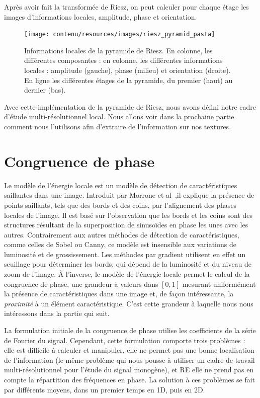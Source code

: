 Après avoir fait la transformée de Riesz, on peut calculer pour chaque étage les images d'informations locales, amplitude, phase et orientation.

\begin{figure}[hp]
    \centering
    \texttt{[image: contenu/resources/images/riesz\_pyramid\_pasta]}
    \caption[Informations locales de la pyramide de Riesz]{Informations locales de la pyramide de Riesz. En colonne, les différentes composantes : en colonne, les différentes informations locales : amplitude (gauche), phase (milieu) et orientation (droite). En ligne les différentes étages de la pyramide, du premier (haut) au dernier (bas).}
    \label{fig:riesz-pyramid-local}
\end{figure}

Avec cette implémentation de la pyramide de Riesz, nous avons défini notre cadre d'étude multi-résolutionnel local. Nous allons voir dans la prochaine partie comment nous l'utilisons afin d'extraire de l'information sur nos textures.

\section{Congruence de phase}

Le modèle de l'énergie locale est un modèle de détection de caractéristiques saillantes dans une image. Introduit par Morrone et al~\cite{morrone_mach_1986, morrone_feature_1987},il explique la présence de points saillants, tels que des bords et des coins, par l'alignement des phases locales de l'image. Il est basé sur l'observation que les bords et les coins sont des structures résultant de la superposition de sinusoïdes en phase les unes avec les autres. Contrairement aux autres méthodes de détection de caractéristiques, comme celles de Sobel ou Canny, ce modèle est insensible aux variations de luminosité et de grossissement. Les méthodes par gradient utilisent en effet un seuillage pour déterminer les bords, qui dépend de la luminosité et du niveau de zoom de l'image. À l'inverse, le modèle de l'énergie locale permet le calcul de la congruence de phase, une grandeur à valeurs dans $[0, 1]$ mesurant uniformément la présence de caractéristiques dans une image et, de façon intéressante, la \textit{proximité} à un élément caractéristique. C'est cette grandeur à laquelle nous nous intéressons dans la partie qui suit.

La formulation initiale de la congruence de phase utilise les coefficients de la série de Fourier du signal. Cependant, cette formulation comporte trois problèmes : elle est difficile à calculer et manipuler, elle ne permet pas une bonne localisation de l'information (le même problème qui nous pousse à utiliser un cadre de travail multi-résolutionnel pour l'étude du signal monogène), et RE elle ne prend pas en compte la répartition des fréquences en phase. La solution à ces problèmes se fait par différents moyens, dans un premier temps en 1D, puis en 2D.

